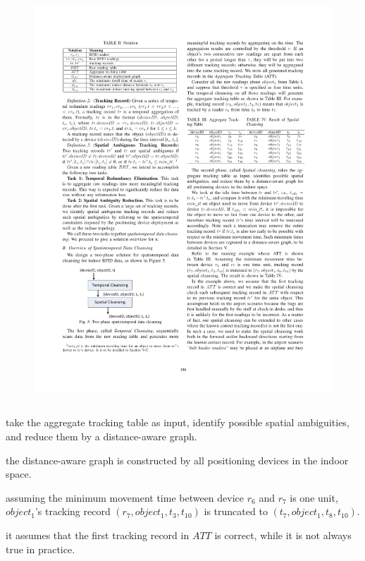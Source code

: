 \begin{frame}
\begin{columns}[c]
  \begin{figure}[tb]
    \includegraphics[width=\columnwidth]{figures/3-2/3-2-6.pdf}
  \end{figure}

\end{columns}

\vspace{10pt}
\begin{sitemize}
  \item take the aggregate tracking table as input, identify possible spatial ambiguities, and reduce them by a distance-aware graph.
  \item the distance-aware graph is constructed by all positioning devices in the indoor space.
  \item assuming the minimum movement time between device $r_6$ and $r_7$ is one unit, $object_1$'s tracking record $(r_7, object_1, t_3, t_{10})$ is truncated to $(t_7, object_1, t_8, t_{10})$.
  \item it assumes that the first tracking record in $ATT$ is correct, while it is not always true in practice.
\end{sitemize}

\end{frame}

